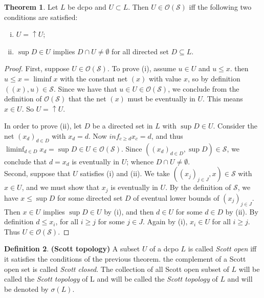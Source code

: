 \documentclass[a4paper,12pt]{article}
\theoremstyle{definition}
\newtheorem{theorem}{Theorem}[section]
\newtheorem{definition}[theorem]{Definition}
\begin{document}
\begin{theorem}\label{scottprot} Let $L$ be dcpo and $U \subset L$. Then $U \in \mathcal{O}(\mathcal{S})$ iff the following two conditions are satisfied:
\begin{enumerate}[(i)]
    \item $U = \uparrow U$;
    \item $\sup D \in U$ implies $D \cap U \neq \emptyset$ for all directed set $D \subseteq L$.
\end{enumerate}
\end{theorem}
\begin{proof}
First, suppose $U \in \mathcal{O}(\mathcal{S})$. To prove (i), assume $u \in U$ and $u \leq x$. then $u \leq x = \liminf  x$ with the constant net $(x)$ with value $x$, so by definition $((x), u) \in \mathcal{S}$. Since we have that $u \in U \in \mathcal{O}(\mathcal{S})$, we conclude from the definition of $\mathcal{O}(\mathcal{S})$ that the net $(x)$ must be eventually in $U$. This means $x \in U$. So $U = \uparrow U$.

In order to prove (ii), let $D$ be a directed set in $L$ with $\sup D \in U$. Consider the net $(x_d)_{d \in D}$ with $x_d = d$. Now $inf_{c\geq d} x_c = d$, and thus $\liminf_{d \in D} x_d = \sup D \in U \in \mathcal{O}(\mathcal{S})$. Since $((x_d)_{d \in D}, \sup D) \in \mathcal{S}$, we conclude that $d = x_d$ is eventually in $U$; whence $D \cap U \neq \emptyset$.\\

Second, suppose that $U$ satisfies (i) and (ii). We take $((x_j)_{j \in J}, x) \in \mathcal{S}$ with $x \in U$, and we must show that $x_j$ is eventually in $U$. By the definition of $\mathcal{S}$, we have $x \leq \sup D$ for some directed set $D$ of eventual lower bounds of $(x_j)_{j \in J}$. Then $x \in U$ implies $\sup D \in U$ by (i), and then $d \in U$ for some $d \in D$ by (ii). By definition $d \leq x_i$, for all $i \geq j$ for some $j \in J$. Again by (i), $x_i \in U$ for all $i \geq j$. Thus $U \in \mathcal{O}(\mathcal{S})$.
\end{proof}

\begin{definition}\textbf{(Scott topology)} A subset $U$ of a dcpo $L$ is called \emph{Scott open} iff it satisfies the conditions of the previous theorem. the complement of a Scott open set is called \emph{Scott closed}. The collection of all Scott open subset of $L$ will be called the \emph{Scott topology} of L and will be called the \emph{Scott topology} of $L$ and will be denoted by $\sigma(L)$.
\end{definition}
\end{document}
